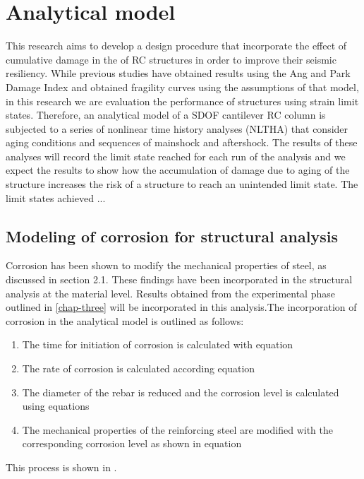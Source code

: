 \chapter{Analytical model}
\label{chap-four}
This research aims to develop a design procedure that incorporate the effect of cumulative damage in the of RC structures in order to improve their seismic resiliency. While previous studies have obtained results using the Ang and Park Damage Index and obtained fragility curves using the assumptions of that model, in this research we are evaluation the performance of structures using strain limit states. Therefore, an analytical model of a SDOF cantilever RC column is subjected to a series of nonlinear time history analyses (NLTHA) that consider aging conditions and sequences of mainshock and aftershock. The results of these analyses will record the limit state reached for each run of the analysis and we expect the results to show how the accumulation of damage due to aging of the structure increases the risk of a structure to reach an unintended limit state. The limit states achieved ...

\section{Modeling of corrosion for structural analysis}

Corrosion has been shown to modify the mechanical properties of steel, as discussed in section 2.1. These findings have been incorporated in the structural analysis at the material level. Results obtained from the experimental phase outlined in \ref{chap-three} will be incorporated in this analysis.The incorporation of corrosion in the analytical model is outlined as follows:
\begin{enumerate}
	\item The time for initiation of corrosion is calculated with equation  
	\item The rate of corrosion is calculated according equation 
	\item The diameter of the rebar is reduced and the corrosion level is calculated using equations   
	\item The mechanical properties of the reinforcing steel are modified with the corresponding corrosion level as shown in equation 
\end{enumerate}

This process is shown in .

